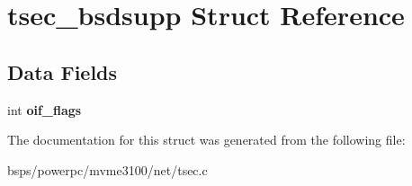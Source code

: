 \hypertarget{structtsec__bsdsupp}{}\section{tsec\+\_\+bsdsupp Struct Reference}
\label{structtsec__bsdsupp}
\subsection*{Data Fields}
\begin{DoxyCompactItemize}
\item 
\mbox{\label{structtsec__bsdsupp_a533adad6f28974e685e50ee5e5704b98}} 
int {\bfseries oif\+\_\+flags}
\end{DoxyCompactItemize}


The documentation for this struct was generated from the following file\+:\begin{DoxyCompactItemize}
\item 
bsps/powerpc/mvme3100/net/tsec.\+c\end{DoxyCompactItemize}
